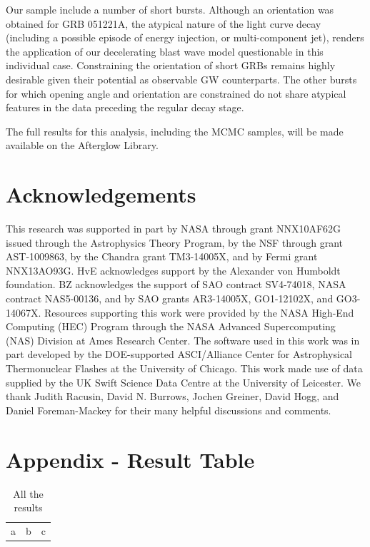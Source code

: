 Our sample include a number of short bursts. Although an orientation was obtained for GRB 051221A, the atypical nature of the light curve decay (including a  possible episode of energy injection, or multi-component jet), renders the application of our decelerating blast wave model questionable in this individual case. Constraining the orientation of short GRBs remains highly desirable given their potential as observable GW counterparts.  The other bursts for which opening angle and orientation are constrained do not share atypical features in the data preceding the regular decay stage.

The full results for this analysis, including the MCMC samples, will be made available on the Afterglow Library.


\section{Acknowledgements}

This research was supported in part by NASA through grant NNX10AF62G issued through the Astrophysics Theory Program, by the NSF through grant AST-1009863, by the Chandra grant TM3-14005X, and by Fermi grant NNX13AO93G.  HvE acknowledges support by the Alexander von Humboldt foundation.  BZ acknowledges the support of SAO contract SV4-74018, NASA contract NAS5-00136, and by SAO grants AR3-14005X, GO1-12102X, and GO3-14067X.  Resources supporting this work were provided by the NASA High-End Computing (HEC) Program through the NASA Advanced Supercomputing (NAS) Division at Ames Research Center. The software used in this work was in part developed by the DOE-supported ASCI/Alliance Center for Astrophysical Thermonuclear Flashes at the University of Chicago.  This work made use of data supplied by the UK Swift Science Data Centre at the University of Leicester.  We thank Judith Racusin, David N. Burrows, Jochen Greiner, David Hogg, and Daniel Foreman-Mackey for their many helpful discussions and comments.

\section{Appendix - Result Table}

\begin{table}
\begin{center}
\begin{tabular}{ccc}
a & b & c
\end{tabular}
\end{center}
\caption{All the results }
\end{table}

